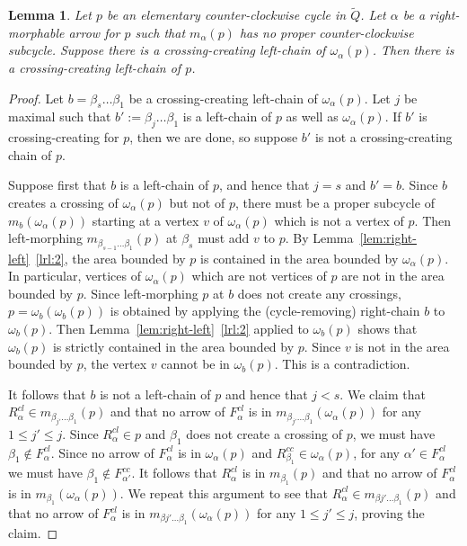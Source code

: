 \documentclass{article}
\newtheorem{lemma}[thm]{Lemma}
\theoremstyle{definition}
\begin{document}
\begin{lemma}\label{lem:right-no-creates-cc-left-ccc-cycle-version}
	Let $p$ be an elementary counter-clockwise cycle in $\widetilde Q$. Let $\alpha$ be a right-morphable arrow for $p$ such that $m_\alpha(p)$ has no proper counter-clockwise subcycle. Suppose there is a crossing-creating left-chain of $\omega_\alpha(p)$. Then there is a crossing-creating left-chain of $p$.
\end{lemma}
\begin{proof}
	Let $b=\beta_s\dots\beta_1$ be a crossing-creating left-chain of $\omega_\alpha(p)$.
	Let $j$ be maximal such that $b':=\beta_j\dots\beta_1$ is a left-chain of $p$ as well as $\omega_\alpha(p)$. If $b'$ is crossing-creating for $p$, then we are done, so suppose $b'$ is not a crossing-creating chain of $p$.

	Suppose first that $b$ is a left-chain of $p$, and hence that $j=s$ and $b'=b$. Since $b$ creates a crossing of $\omega_\alpha(p)$ but not of $p$, there must be a proper subcycle of $m_{b}(\omega_\alpha(p))$ starting at a vertex $v$ of $\omega_\alpha(p)$ which is not a vertex of $p$. Then left-morphing $m_{\beta_{s-1}\dots\beta_{1}}(p)$ at $\beta_s$ must add $v$ to $p$. By Lemma~\ref{lem:right-left}~\eqref{lrl:2}, the area bounded by $p$ is contained in the area bounded by $\omega_\alpha(p)$. In particular, vertices of $\omega_\alpha(p)$ which are not vertices of $p$ are not in the area bounded by $p$. 
	Since left-morphing $p$ at $b$ does not create any crossings, $p=\omega_b(\omega_b(p))$ is obtained by applying the (cycle-removing) right-chain $b$ to $\omega_b(p)$. Then Lemma~\ref{lem:right-left}~\eqref{lrl:2} applied to $\omega_b(p)$ shows that $\omega_b(p)$ is strictly contained in the area bounded by $p$. Since $v$ is not in the area bounded by $p$, the vertex $v$ cannot be in $\omega_b(p)$. This is a contradiction. 




	It follows that $b$ is not a left-chain of $p$ and hence that $j<s$. 
	We claim that $R_\alpha^{cl}\in m_{\beta_{j'}\dots\beta_{1}}(p)$ and that no arrow of $F_\alpha^{cl}$ is in $m_{\beta_{j'}\dots\beta_{1}}(\omega_\alpha(p))$ for any $1\leq j'\leq j$.
	Since $R_\alpha^{cl}\in p$ and $\beta_1$ does not create a crossing of $p$, we must have $\beta_1\not\in F_\alpha^{cl}$. Since no arrow of $F_\alpha^{cl}$ is in $\omega_\alpha(p)$ and $R_{\beta_1}^{cc}\in\omega_\alpha(p)$, for any $\alpha'\in F_\alpha^{cl}$ we must have $\beta_1\not\in F_{\alpha'}^{cc}$. It follows that $R_\alpha^{cl}$ is in $m_{\beta_1}(p)$ and that no arrow of $F_\alpha^{cl}$ is in $m_{\beta_1}(\omega_\alpha(p))$. We repeat this argument to see that $R_\alpha^{cl}\in m_{\beta{j'}\dots\beta_{1}}(p)$ and that no arrow of $F_\alpha^{cl}$ is in $m_{\beta{j'}\dots\beta_{1}}(\omega_\alpha(p))$ for any $1\leq j'\leq j$, proving the claim.




\end{proof}
\end{document}
